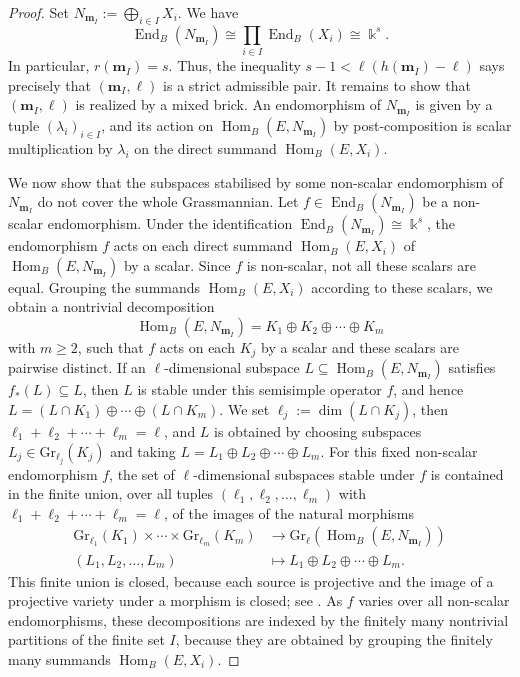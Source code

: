 \documentclass[a4,12pt]{amsart}
\numberwithin{equation}{section} %
\def\Hom{\operatorname{Hom}} %
\def\End{\operatorname{End}} %
\def\Gr{\mathrm{Gr}} %
\theoremstyle{definition} %
\begin{document}
\begin{proof}
Set $N_{\mathbf{m}_I}:=\bigoplus_{i\in I}X_i$. We have 
\[
\End_B(N_{\mathbf{m}_I})\cong\prod_{i\in I}\End_B(X_i)\cong\Bbbk^s.
\]
In particular, $r(\mathbf{m}_I)=s$. Thus, the inequality $s-1<\ell(h(\mathbf{m}_I)-\ell)$ says precisely that $(\mathbf{m}_I,\ell)$ is a strict admissible pair. It remains to show that $(\mathbf{m}_I,\ell)$ is realized by a mixed brick. An endomorphism of $N_{\mathbf{m}_I}$ is given by a tuple $(\lambda_i)_{i\in I}$, and its action on $\Hom_B(E,N_{\mathbf{m}_I})$ by post-composition is scalar multiplication by $\lambda_i$ on the direct summand $\Hom_B(E,X_i)$.

We now show that the subspaces stabilised by some non-scalar endomorphism of $N_{\mathbf{m}_I}$ do not cover the whole Grassmannian. Let $f\in\End_B(N_{\mathbf{m}_I})$ be a non-scalar endomorphism. Under the identification $\End_B(N_{\mathbf{m}_I})\cong\Bbbk^s$, the endomorphism $f$ acts on each direct summand $\Hom_B(E,X_i)$ of $\Hom_B(E,N_{\mathbf{m}_I})$ by a scalar.
Since $f$ is non-scalar, not all these scalars are equal.
Grouping the summands $\Hom_B(E,X_i)$ according to these scalars, we obtain a nontrivial decomposition
\[
\Hom_B(E,N_{\mathbf{m}_I})=K_1\oplus K_2\oplus\cdots\oplus K_m
\]
with $m\geq2$, such that $f$ acts on each $K_j$ by a scalar and these scalars are pairwise distinct.
If an $\ell$-dimensional subspace $L\subseteq\Hom_B(E,N_{\mathbf{m}_I})$ satisfies $f_*(L)\subseteq L$, then $L$ is stable under this semisimple operator $f$, and hence $L=(L\cap K_1)\oplus\cdots\oplus(L\cap K_m)$. We set $\ell_j:=\dim(L\cap K_j)$, then $\ell_1+\ell_2+\cdots+\ell_m=\ell$, and $L$ is obtained by choosing subspaces $L_j\in\Gr_{\ell_j}(K_j)$ and taking $L=L_1\oplus L_2\oplus\cdots\oplus L_m$.
For this fixed non-scalar endomorphism $f$, the set of $\ell$-dimensional subspaces stable under $f$ is contained in the finite union, over all tuples $(\ell_1,\ell_2,\ldots,\ell_m)$ with $\ell_1+\ell_2+\cdots+\ell_m=\ell$, of the images of the natural morphisms
\[
\begin{aligned}
\Gr_{\ell_1}(K_1)\times\cdots\times\Gr_{\ell_m}(K_m)
&\longrightarrow
\Gr_\ell(\Hom_B(E,N_{\mathbf{m}_I}))\\
(L_1,L_2,\ldots,L_m)&\longmapsto L_1\oplus L_2\oplus\cdots\oplus L_m .
\end{aligned}
\]
This finite union is closed, because each source is projective and the image of a projective variety under a morphism is closed; see \cite[Chapter~I, Section 5, Theorem~1.10]{Shafarevich-2013}. As $f$ varies over all non-scalar endomorphisms, these decompositions are indexed by the finitely many nontrivial partitions of the finite set $I$, because they are obtained by grouping the finitely many summands $\Hom_B(E,X_i)$.


\end{proof}
\end{document}
